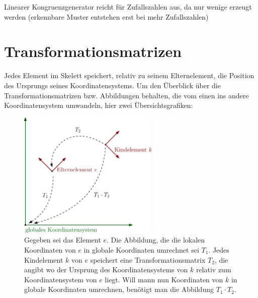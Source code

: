 Linearer Kongruenzgenerator reicht für Zufallszahlen aus, da nur wenige erzeugt werden (erkennbare Muster entstehen erst bei mehr Zufallszahlen) 


\section{Transformationsmatrizen}
\label{implementation_detail_matrices}


Jedes Element im Skelett speichert, relativ zu seinem Elternelement, die Position des Ursprungs seines Koordinatensystems. Um den Überblick über die Transformationsmatrizen bzw. Abbildungen behalten, die vom einen ins andere Koordinatensystem umwandeln, hier zwei Übersichtsgrafiken:

\begin{figure}
 \centering
 \includegraphics[width=0.6\textwidth]{graphics/transformation_matrices.eps}
 \caption{Gegeben sei das Element $e$. Die Abbildung, die die lokalen Koordinaten von $e$ in globale Koordinaten umrechnet sei $T_1$.
 Jedes Kindelement $k$ von $e$ speichert eine Transformationsmatrix $T_2$, die angibt wo der Ursprung des Koordinatensystems von $k$ relativ zum Koordinatensystem von $e$ liegt. Will mann nun Koordinaten von $k$ in globale Koordinaten umrechnen, benötigt man die Abbildung $T_1 \cdot T_2$.}
\end{figure}

